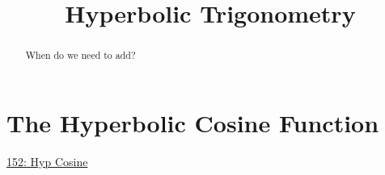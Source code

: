 \documentclass{ximera}
\title{Hyperbolic Trigonometry}
\begin{document}
\begin{abstract}
When do we need to add?
\end{abstract}
\maketitle


\section{The Hyperbolic Cosine Function}




\begin{onlineOnly}
    \begin{center}
\end{center}
\end{onlineOnly}

\href{https://www.desmos.com/calculator/nubdwzgsa9}{152: Hyp Cosine}
\end{document}
